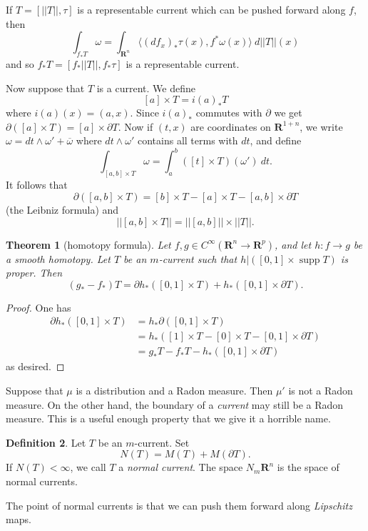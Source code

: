 \documentclass[reqno,12pt,letterpaper]{amsart}
\newcommand{\RR}{\mathbf{R}}
\DeclareMathOperator{\supp}{supp}
\newcommand{\dfn}[1]{\emph{#1}\index{#1}}
\newtheorem{theorem}{Theorem}[section]
\theoremstyle{definition}
\newtheorem{definition}[theorem]{Definition}
\numberwithin{equation}{section}
\begin{document}
If $T = [||T||, \tau]$ is a representable current which can be pushed forward along $f$, then
$$\int_{f_*T} \omega = \int_{\RR^n} \langle (df_x)_* \tau(x), f^*\omega(x) \rangle ~d||T||(x)$$
and so $f_*T = [f_*||T||, f_* \tau]$ is a representable current.

Now suppose that $T$ is a current. We define
$$[a] \times T = i(a)_*T$$
where $i(a)(x) = (a, x)$. Since $i(a)_*$ commutes with $\partial$ we get $\partial([a] \times T) = [a] \times \partial T$.
Now if $(t, x)$ are coordinates on $\RR^{1 + n}$, we write $\omega = dt \wedge \omega' + \overline \omega$ where $dt \wedge \omega'$ contains all terms with $dt$, and define
$$\int_{[a, b] \times T} \omega = \int_a^b ([t] \times T)(\omega') ~dt.$$
It follows that
$$\partial([a, b] \times T) = [b] \times T - [a] \times T - [a, b] \times \partial T$$
(the Leibniz formula) and
$$||[a, b] \times T|| = ||[a, b]|| \times ||T||.$$

\begin{theorem}[homotopy formula]
Let $f,g \in C^\infty(\RR^n \to \RR^p)$, and let $h: f \to g$ be a smooth homotopy.
Let $T$ be an $m$-current such that $h|([0, 1] \times \supp T)$ is proper. Then
$$(g_* - f_*)T = \partial h_*([0, 1] \times T) + h_*([0, 1] \times \partial T).$$
\end{theorem}
\begin{proof}
One has
\begin{align*}
\partial h_*([0, 1] \times T) &= h_*\partial([0, 1] \times T)\\
&= h_*([1] \times T - [0] \times T - [0, 1] \times \partial T)\\
&= g_*T - f_*T - h_*([0, 1] \times \partial T)
\end{align*}
as desired.
\end{proof}

Suppose that $\mu$ is a distribution and a Radon measure. Then $\mu'$ is not a Radon measure.
On the other hand, the boundary of a \emph{current} may still be a Radon measure.
This is a useful enough property that we give it a horrible name.

\begin{definition}
Let $T$ be an $m$-current. Set
$$N(T) = M(T) + M(\partial T).$$
If $N(T) < \infty$, we call $T$ a \dfn{normal current}.
The space $N_m\RR^n$ is the space of normal currents.
\end{definition}

The point of normal currents is that we can push them forward along \emph{Lipschitz} maps.
\end{document}
